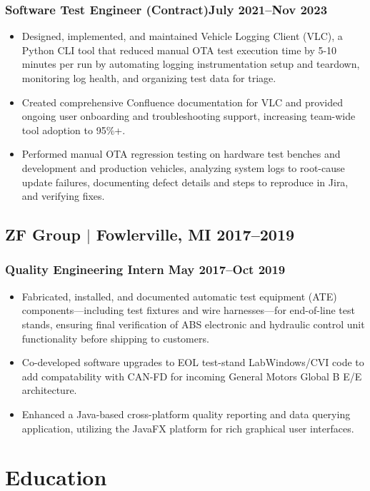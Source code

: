 \documentclass[10pt]{article}
\begin{document}
\subsubsection{Software Test Engineer (Contract)\hfill July 2021--Nov 2023}
\begin{itemize}
	\item Designed, implemented, and maintained Vehicle Logging Client (VLC),
	a Python CLI tool that reduced manual OTA test execution time by 5-10 minutes per run
	by automating logging instrumentation setup and teardown, monitoring log health, and 
	organizing test data for triage. 
	\item Created comprehensive Confluence documentation for VLC and provided ongoing
	user onboarding and troubleshooting support, increasing team-wide tool adoption to 95\%+.
	\item Performed manual OTA regression testing on hardware test benches and development and 
	production vehicles, analyzing system logs to root-cause update failures, 
	documenting defect details and steps to reproduce in Jira, and verifying fixes.
\end{itemize}

\subsection{ZF Group $|$ {\normalfont Fowlerville, MI} \hfill 2017--2019}

\subsubsection{Quality Engineering Intern \hfill May 2017--Oct 2019}
\begin{itemize}
	\item Fabricated, installed, and documented automatic test equipment (ATE) components—including 
	test fixtures and wire harnesses—for end-of-line test stands, ensuring final verification of ABS 
	electronic and hydraulic control unit functionality before shipping to customers.
	\item Co-developed software upgrades to EOL test-stand LabWindows/CVI code to add compatability with CAN-FD for 
	incoming General Motors Global B E/E architecture.
	\item Enhanced a Java-based cross-platform quality reporting and data querying application, utilizing the JavaFX 
	platform for rich graphical user interfaces.
\end{itemize}

\section{Education}
\end{document}
